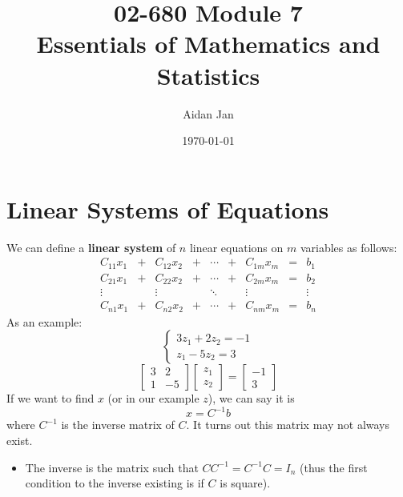 \documentclass[10pt]{article}
\title{02-680 Module 7 \\ \large{Essentials of Mathematics and Statistics}}
\author{Aidan Jan}
\date{\today}
\begin{document}
\maketitle

\section*{Linear Systems of Equations}
We can define a \textbf{linear system} of $n$ linear equations on $m$ variables as follows:
\[\begin{matrix}
C_{11} x_1 &+& C_{12} x_2 &+& \cdots &+& C_{1m}x_m &=& b_1 \\
C_{21} x_1 &+& C_{22} x_2 &+& \cdots &+& C_{2m}x_m &=& b_2 \\
\vdots & & \vdots & & \ddots & & \vdots & & \vdots \\
C_{n1} x_1 &+& C_{n2} x_2 &+& \cdots &+& C_{nm}x_m &=& b_n
\end{matrix}\]
As an example:
\[\begin{cases} 3z_1 + 2z_2 = -1 \\ z_1 - 5z_2 = 3 \end{cases}\]
\[\begin{bmatrix} 3 & 2 \\ 1 & -5 \end{bmatrix} \begin{bmatrix} z_1 \\ z_2 \end{bmatrix} = \begin{bmatrix} -1 \\ 3 \end{bmatrix}\]
If we want to find $x$ (or in our example $z$), we can say it is
\[x = C^{-1}b\]
where $C^{-1}$ is the inverse matrix of $C$.  It turns out this matrix may not always exist.
\begin{itemize}
	\item The inverse is the matrix such that $CC^{-1} = C^{-1}C = I_n$ (thus the first condition to the inverse existing is if $C$ is square).
\end{itemize}
\end{document}
